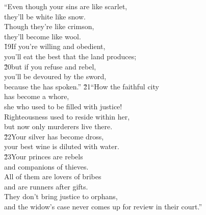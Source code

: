 \begin{poetry}
\poeml ``Even though your sins are like scarlet, \\
\poemll    they'll be white like snow. \\
\poeml Though they're like crimson, \\
\poemll    they'll become like wool. \\
\poeml \v{19}If you're willing and obedient, \\
\poemll    you'll eat the best that the land produces; \\
\poeml \v{20}but if you refuse and rebel, \\
\poemll    you'll be devoured by the sword, \\
\poemlll       because the  has spoken.''
\poeml \v{21}``How the faithful city \\
\poemll    has become a whore, \\
\poemlll       she who used to be filled with justice! \\
\poeml Righteousness used to reside within her, \\
\poemll    but now only murderers live there. \\
\poeml \v{22}Your silver has become dross, \\
\poemll    your best wine is diluted with water. \\
\poeml \v{23}Your princes are rebels \\
\poemll    and companions of thieves. \\
\poeml All of them are lovers of bribes \\
\poemll    and are runners after gifts. \\
\poeml They don't bring justice to orphans, \\
\poemll    and the widow's case never comes up for review in their court.''
\end{poetry}

